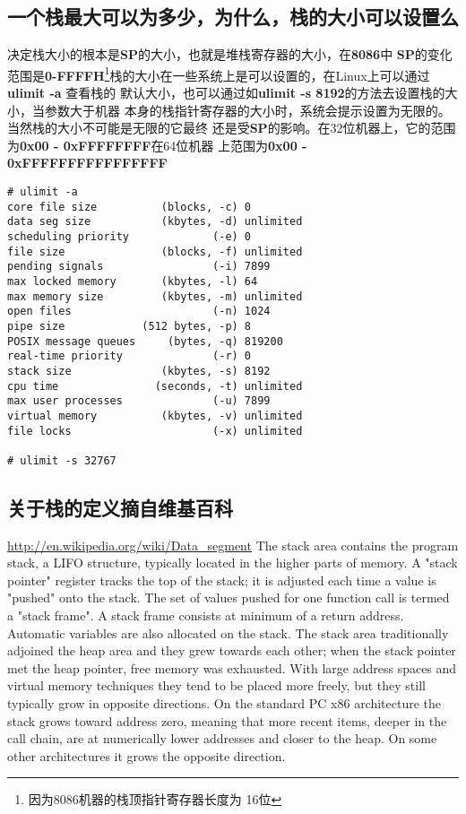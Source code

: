\documentclass{article}
\begin{document}
\subsection{一个栈最大可以为多少，为什么，栈的大小可以设置么}
决定栈大小的根本是\textbf{SP}的大小，也就是堆栈寄存器的大小，在\textbf{8086}中
\textbf{SP}的变化范围是\textbf{0-FFFFH}\footnote{因为8086机器的栈顶指针寄存器长度为
16位}栈的大小在一些系统上是可以设置的，在Linux上可以通过\textbf{ulimit -a} 查看栈的
默认大小，也可以通过如\textbf{ulimit -s 8192}的方法去设置栈的大小，当参数大于机器
本身的栈指针寄存器的大小时，系统会提示设置为无限的。当然栈的大小不可能是无限的它最终
还是受\textbf{SP}的影响。在32位机器上，它的范围为\textbf{0x00 - 0xFFFFFFFF}在64位机器
上范围为\textbf{0x00 - 0xFFFFFFFFFFFFFFFF}
\begin{verbatim}
# ulimit -a
core file size          (blocks, -c) 0
data seg size           (kbytes, -d) unlimited
scheduling priority             (-e) 0
file size               (blocks, -f) unlimited
pending signals                 (-i) 7899
max locked memory       (kbytes, -l) 64
max memory size         (kbytes, -m) unlimited
open files                      (-n) 1024
pipe size            (512 bytes, -p) 8
POSIX message queues     (bytes, -q) 819200
real-time priority              (-r) 0
stack size              (kbytes, -s) 8192
cpu time               (seconds, -t) unlimited
max user processes              (-u) 7899
virtual memory          (kbytes, -v) unlimited
file locks                      (-x) unlimited

# ulimit -s 32767 
\end{verbatim}

\subsection{关于栈的定义摘自维基百科}
\url{http://en.wikipedia.org/wiki/Data\_segment}
\textsf{
The stack area contains the program stack, a LIFO structure, typically located in the 
higher parts of memory. A "stack pointer" register tracks the top of the stack; it is 
adjusted each time a value is "pushed" onto the stack. The set of values pushed for 
one function call is termed a "stack frame". A stack frame consists at minimum of a 
return address. Automatic variables are also allocated on the stack.
The stack area traditionally adjoined the heap area and they grew towards each other; 
when the stack pointer met the heap pointer, free memory was exhausted. With large 
address spaces and virtual memory techniques they tend to be placed more freely, but 
they still typically grow in opposite directions. On the standard PC x86 architecture 
the stack grows toward address zero, meaning that more recent items, deeper in the call 
chain, are at numerically lower addresses and closer to the heap. On some other 
architectures it grows the opposite direction.}
\end{document}
